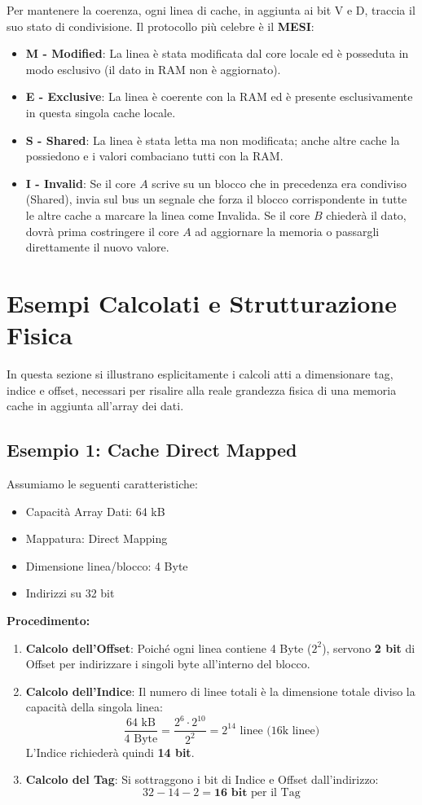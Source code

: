 Per mantenere la coerenza, ogni linea di cache, in aggiunta ai bit V e D, traccia il suo stato di condivisione. Il protocollo più celebre è il \textbf{MESI}:
\begin{itemize}
    \item \textbf{M - Modified}: La linea è stata modificata dal core locale ed è posseduta in modo esclusivo (il dato in RAM non è aggiornato).
    \item \textbf{E - Exclusive}: La linea è coerente con la RAM ed è presente esclusivamente in questa singola cache locale.
    \item \textbf{S - Shared}: La linea è stata letta ma non modificata; anche altre cache la possiedono e i valori combaciano tutti con la RAM.
    \item \textbf{I - Invalid}: Se il core $A$ scrive su un blocco che in precedenza era condiviso (Shared), invia sul bus un segnale che forza il blocco corrispondente in tutte le altre cache a marcare la linea come Invalida. Se il core $B$ chiederà il dato, dovrà prima costringere il core $A$ ad aggiornare la memoria o passargli direttamente il nuovo valore.
\end{itemize}

\section{Esempi Calcolati e Strutturazione Fisica}

In questa sezione si illustrano esplicitamente i calcoli atti a dimensionare tag, indice e offset, necessari per risalire alla reale grandezza fisica di una memoria cache in aggiunta all'array dei dati.

\subsection{Esempio 1: Cache Direct Mapped}
Assumiamo le seguenti caratteristiche:
\begin{itemize}
    \item Capacità Array Dati: 64 kB
    \item Mappatura: Direct Mapping
    \item Dimensione linea/blocco: 4 Byte 
    \item Indirizzi su 32 bit
\end{itemize}

\textbf{Procedimento:}
\begin{enumerate}
    \item \textbf{Calcolo dell'Offset}: Poiché ogni linea contiene 4 Byte ($2^2$), servono \textbf{2 bit} di Offset per indirizzare i singoli byte all'interno del blocco.
    \item \textbf{Calcolo dell'Indice}: Il numero di linee totali è la dimensione totale diviso la capacità della singola linea:
    \[ \frac{64 \text{ kB}}{4 \text{ Byte}} = \frac{2^6 \cdot 2^{10}}{2^2} = 2^{14} \text{ linee (16k linee)} \]
    L'Indice richiederà quindi \textbf{14 bit}.
    \item \textbf{Calcolo del Tag}: Si sottraggono i bit di Indice e Offset dall'indirizzo:
    \[ 32 - 14 - 2 = \textbf{16 bit} \text{ per il Tag} \]
\end{enumerate}

